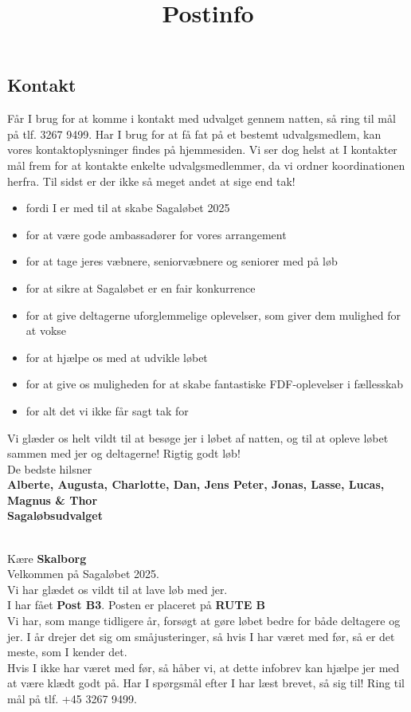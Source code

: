 \subsection{Kontakt}
Får I brug for at komme i kontakt med udvalget gennem natten, så ring til mål på tlf. 3267 9499. Har I brug for at få fat på et bestemt udvalgsmedlem, kan vores kontaktoplysninger findes på hjemmesiden. Vi ser dog helst at I kontakter mål frem for at kontakte enkelte udvalgsmedlemmer, da vi ordner koordinationen herfra.
\newline
Til sidst er der ikke så meget andet at sige end tak!\begin{itemize}
  \item fordi I er med til at skabe Sagaløbet 2025
  \item for at være gode ambassadører for vores arrangement
  \item for at tage jeres væbnere, seniorvæbnere og seniorer med på løb
  \item for at sikre at Sagaløbet er en fair konkurrence
  \item for at give deltagerne uforglemmelige oplevelser, som giver dem mulighed for at vokse
  \item for at hjælpe os med at udvikle løbet
  \item for at give os muligheden for at skabe fantastiske FDF-oplevelser i fællesskab
  \item for alt det vi ikke får sagt tak for
\end{itemize}
Vi glæder os helt vildt til at besøge jer i løbet af natten, og til at opleve løbet sammen med jer og deltagerne!
\newline
Rigtig godt løb!\\
\newline
\textcolor{søblå}{De bedste hilsner}\\
\textcolor{natblå}{\textbf{Alberte, Augusta, Charlotte, Dan, Jens Peter, Jonas, Lasse, Lucas, Magnus \& Thor}}\\
\textcolor{natblå}{\textbf{Sagaløbsudvalget}}\\
\newpage
\title{Postinfo}\\
Kære \textbf{Skalborg}\\
\newline
Velkommen på Sagaløbet 2025.\\
Vi har glædet os vildt til at lave løb med jer.\\
\newline
I har fået \textbf{Post B3}. Posten er placeret på \textbf{RUTE B}\\
Vi har, som mange tidligere år, forsøgt at gøre løbet bedre for både deltagere og jer. I år drejer det sig om småjusteringer, så hvis I har været med før, så er det meste, som I kender det.\\
\newline
Hvis I ikke har været med før, så håber vi, at dette infobrev kan hjælpe jer med at være klædt godt på. Har I spørgsmål efter I har læst brevet, så sig til! Ring til mål på tlf. +45 3267 9499.
